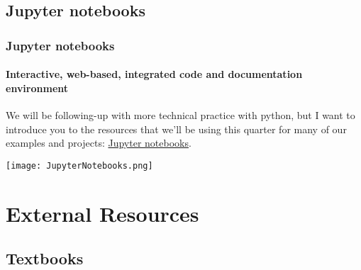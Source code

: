 \documentclass[hyperref={colorlinks=true}]{beamer}
\begin{document}
\subsection[Jupyter notebooks]{Jupyter notebooks}

\begin{frame}[fragile]
  \frametitle{Jupyter notebooks}
  \framesubtitle{Interactive, web-based, integrated code and documentation environment}

  We will be following-up with more technical practice with python, but I want to introduce you to the resources that we'll be using this quarter for many of our examples and projects: \href{http://jupyter.org/}{Jupyter notebooks}.

  \centering
  \texttt{[image: JupyterNotebooks.png]}
  
\end{frame}

%
%
%
%

\section[External Resources]{External Resources}

\subsection[Textbooks]{Textbooks}
\end{document}
